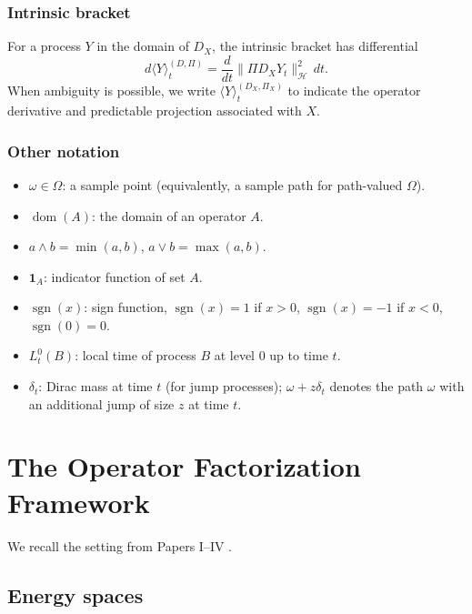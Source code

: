 \documentclass[12pt]{article}
\theoremstyle{plain}
\theoremstyle{definition}
\theoremstyle{remark}
\newcommand{\HH}{\mathcal{H}}
\newcommand{\dom}{\operatorname{dom}}
\newcommand{\sgn}{\operatorname{sgn}}
\begin{document}
\subsubsection*{Intrinsic bracket}
For a process $Y$ in the domain of $D_X$, the intrinsic bracket has differential
\begin{equation}\label{eq:intrinsic-bracket-def}
d\langle Y \rangle_t^{(D,\Pi)} = \frac{d}{dt}\|\Pi D_X Y_t\|_{\HH}^2 \, dt.
\end{equation}
When ambiguity is possible, we write $\langle Y \rangle_t^{(D_X, \Pi_X)}$ to indicate the operator derivative and predictable projection associated with $X$.

\subsubsection*{Other notation}
\begin{itemize}
\item $\omega \in \Omega$: a sample point (equivalently, a sample path for path-valued $\Omega$).
\item $\dom(A)$: the domain of an operator $A$.
\item $a \wedge b = \min(a,b)$, $a \vee b = \max(a,b)$.
\item $\mathbf{1}_A$: indicator function of set $A$.
\item $\sgn(x)$: sign function, $\sgn(x) = 1$ if $x > 0$, $\sgn(x) = -1$ if $x < 0$, $\sgn(0) = 0$.
\item $L_t^0(B)$: local time of process $B$ at level $0$ up to time $t$.
\item $\delta_t$: Dirac mass at time $t$ (for jump processes); $\omega + z\delta_t$ denotes the path $\omega$ with an additional jump of size $z$ at time $t$.
\end{itemize}

\section{The Operator Factorization Framework}\label{sec:framework}

We recall the setting from Papers I--IV \cite{Fontes2026a, Fontes2026b, Fontes2026c, Fontes2026d}.

\subsection{Energy spaces}
\end{document}
